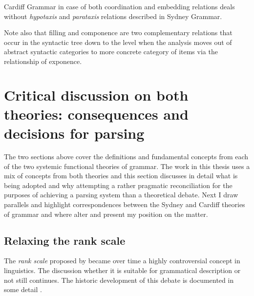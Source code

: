 Cardiff Grammar in case of both coordination and embedding relations deals without \textit{hypotaxis} and \textit{parataxis} relations described in Sydney Grammar.

%
Note also that filling and componence are two complementary relations that occur in the syntactic tree down to the level when the analysis moves out of abstract syntactic categories to more concrete category of items via the relationship of exponence.

\section{Critical discussion on both theories: consequences and decisions for parsing} 
\label{sec:critical-on-two-theories}
The two sections above cover the definitions and fundamental concepts from each of the two systemic functional theories of grammar. The work in this thesis uses a mix of concepts from both theories and this section discusses in detail what is being adopted and why attempting a rather pragmatic reconciliation for the purposes of achieving a parsing system than a theoretical debate. Next I draw parallels and highlight correspondences between the Sydney and Cardiff theories of grammar and where alter and present my position on the matter. 

\subsection{Relaxing the rank scale}
\label{sec:rank-system}

The \textit{rank scale} proposed by \citet{Halliday2002} became over time a highly controversial concept in linguistics. The discussion whether it is suitable for grammatical description or not still continues. The historic development of this debate is documented in some detail \cite[309--338]{Fawcett2000}. %


